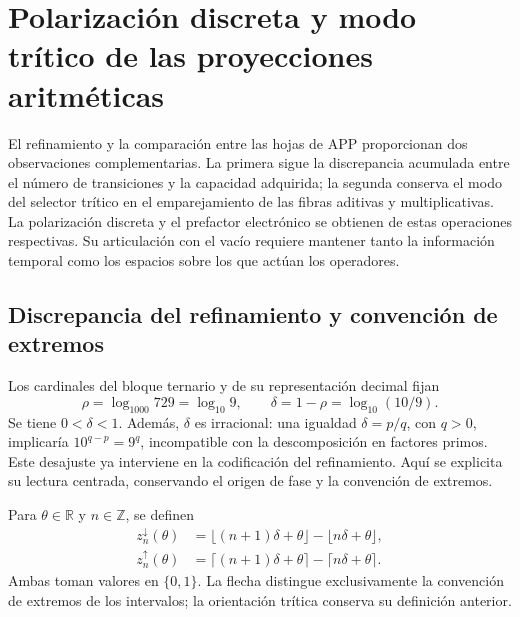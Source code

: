 \section{Polarización discreta y modo trítico de las proyecciones aritméticas}
\label{iii:iii:sec:vacancias-prefactor}

El refinamiento y la comparación entre las hojas de APP proporcionan dos
observaciones complementarias. La primera sigue la discrepancia acumulada
entre el número de transiciones y la capacidad adquirida; la segunda conserva
el modo del selector trítico en el emparejamiento de las fibras aditivas y
multiplicativas. La polarización discreta y el prefactor electrónico se
obtienen de estas operaciones respectivas. Su articulación con el vacío
requiere mantener tanto la información temporal como los espacios sobre los
que actúan los operadores.

\subsection{Discrepancia del refinamiento y convención de extremos}

Los cardinales del bloque ternario y de su representación decimal fijan
\[
 \rho=\log_{1000}729=\log_{10}9,\qquad
 \delta=1-\rho=\log_{10}(10/9).
\]
Se tiene $0<\delta<1$. Además, $\delta$ es irracional: una igualdad
$\delta=p/q$, con $q>0$, implicaría $10^{q-p}=9^q$, incompatible con
la descomposición en factores primos. Este desajuste ya interviene en la
codificación del refinamiento. Aquí se explicita su lectura centrada,
conservando el origen de fase y la convención de extremos.

\begin{definition}
Para $\theta\in\mathbb R$ y $n\in\mathbb Z$, se definen
\begin{align}
 z_n^{\downarrow}(\theta)
 &=\lfloor(n+1)\delta+\theta\rfloor-\lfloor n\delta+\theta\rfloor,
 \label{iii:iii:vp:lower}\\
 z_n^{\uparrow}(\theta)
 &=\lceil(n+1)\delta+\theta\rceil-\lceil n\delta+\theta\rceil.
 \label{iii:iii:vp:upper}
\end{align}
Ambas toman valores en $\{0,1\}$. La flecha distingue exclusivamente la
convención de extremos de los intervalos; la orientación trítica conserva
su definición anterior.
\end{definition}

